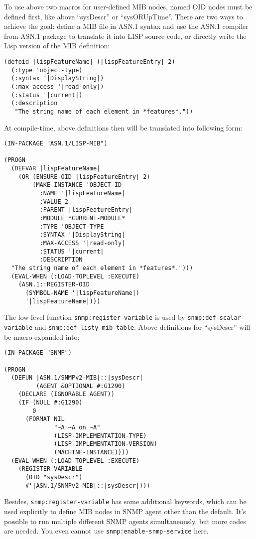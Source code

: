 \documentclass[reprint,natbib,9pt]{sigplanconf}
\begin{document}
To use above two macros for user-defined MIB nodes, named OID nodes
must be defined first, like above ``sysDescr'' or
``sysORUpTime''. There are two ways to achieve the goal: define a
MIB file in ASN.1 syntax and use the ASN.1 compiler from ASN.1 package to
translate it into LISP source code, or
directly write the Lisp version of the MIB definition:

\begin{verbatim}
(defoid |lispFeatureName| (|lispFeatureEntry| 2)
  (:type 'object-type)
  (:syntax '|DisplayString|)
  (:max-access '|read-only|)
  (:status '|current|)
  (:description
   "The string name of each element in *features*."))
\end{verbatim}

At compile-time, above definitions then will be translated into following form:
\begin{verbatim}
(IN-PACKAGE "ASN.1/LISP-MIB")

(PROGN
  (DEFVAR |lispFeatureName|
    (OR (ENSURE-OID |lispFeatureEntry| 2)
        (MAKE-INSTANCE 'OBJECT-ID
          :NAME '|lispFeatureName|
          :VALUE 2
          :PARENT |lispFeatureEntry|
          :MODULE *CURRENT-MODULE*
          :TYPE 'OBJECT-TYPE
          :SYNTAX '|DisplayString|
          :MAX-ACCESS '|read-only|
          :STATUS '|current|
          :DESCRIPTION
  "The string name of each element in *features*.")))
  (EVAL-WHEN (:LOAD-TOPLEVEL :EXECUTE)
    (ASN.1::REGISTER-OID
      (SYMBOL-NAME '|lispFeatureName|)
      '|lispFeatureName|)))
\end{verbatim}

The low-level function \texttt{snmp:register-variable} is used by
\texttt{snmp:def-scalar-variable} and
\texttt{snmp:def-listy-mib-table}.  Above definitions for ``sysDescr''
will be macro-expanded into:
%
\begin{verbatim}
(IN-PACKAGE "SNMP")

(PROGN
  (DEFUN |ASN.1/SNMPv2-MIB|::|sysDescr|
         (AGENT &OPTIONAL #:G1290)
    (DECLARE (IGNORABLE AGENT))
    (IF (NULL #:G1290)
        0
      (FORMAT NIL
              "~A ~A on ~A"
              (LISP-IMPLEMENTATION-TYPE)
              (LISP-IMPLEMENTATION-VERSION)
              (MACHINE-INSTANCE))))
  (EVAL-WHEN (:LOAD-TOPLEVEL :EXECUTE)
    (REGISTER-VARIABLE
      (OID "sysDescr")
      #'|ASN.1/SNMPv2-MIB|::|sysDescr|)))
\end{verbatim}

Besides, \texttt{snmp:register-variable} has some additional keywords, which
can be used explicitly to define MIB nodes in SNMP agent other than
the default. It's possible to run multiple different SNMP agents
simultaneously, but more codes are needed. You even cannot use
\texttt{snmp:enable-snmp-service} here.
\end{document}
